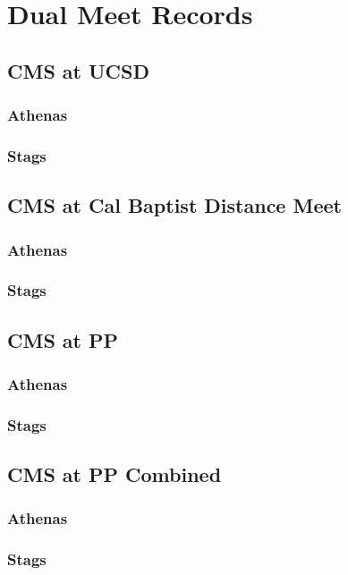 \section{Dual Meet Records}

\subsection{CMS at UCSD}
\subsubsection{Athenas}
\subsubsection{Stags}

\subsection{CMS at Cal Baptist Distance Meet}
\subsubsection{Athenas}
\subsubsection{Stags}

\subsection{CMS at PP}
\subsubsection{Athenas}
\subsubsection{Stags}

\subsection{CMS at PP Combined}
\subsubsection{Athenas}
\subsubsection{Stags}